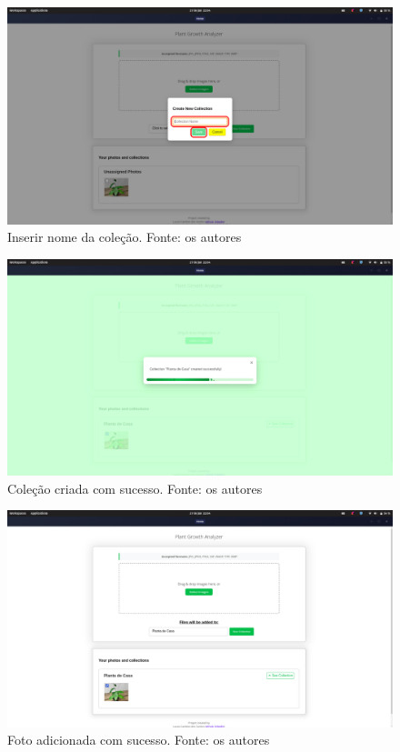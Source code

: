 \begin{figure}[H]
    \centering
    \includegraphics[width=1\textwidth]{../figures/screens/uc003/Screenshot from 2025-06-27 22-04-26.png}
    \caption{Inserir nome da coleção. Fonte: os autores}
    \label{fig:uc003-screen3}
\end{figure}

\begin{figure}[H]
    \centering
    \includegraphics[width=1\textwidth]{../figures/screens/uc003/Screenshot from 2025-06-27 22-04-40.png}
    \caption{Coleção criada com sucesso. Fonte: os autores}
    \label{fig:uc003-screen4}
\end{figure}

\begin{figure}[H]
    \centering
    \includegraphics[width=1\textwidth]{../figures/screens/uc003/Screenshot from 2025-06-27 22-04-48.png}
    \caption{Foto adicionada com sucesso. Fonte: os autores}
    \label{fig:uc003-screen5}
\end{figure}

